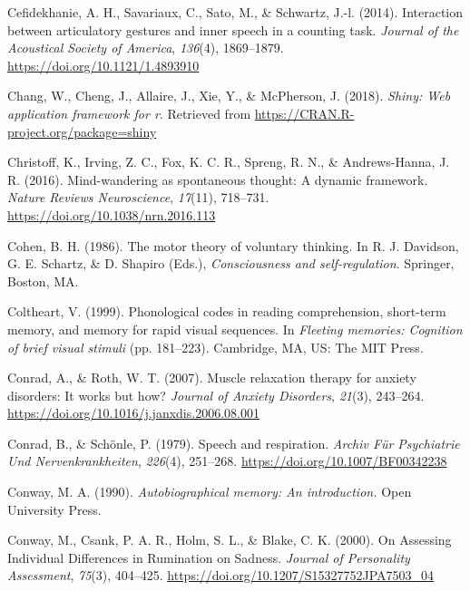 \documentclass[a4paper,12pt,twoside,openright,oldfontcommands]{memoir}
\begin{document}
\leavevmode\hypertarget{ref-cefidekhanie_interaction_2014}{}%
Cefidekhanie, A. H., Savariaux, C., Sato, M., \& Schwartz, J.-l. (2014). Interaction between articulatory gestures and inner speech in a counting task. \emph{Journal of the Acoustical Society of America}, \emph{136}(4), 1869--1879. \url{https://doi.org/10.1121/1.4893910}

\leavevmode\hypertarget{ref-R-shiny}{}%
Chang, W., Cheng, J., Allaire, J., Xie, Y., \& McPherson, J. (2018). \emph{Shiny: Web application framework for r}. Retrieved from \url{https://CRAN.R-project.org/package=shiny}

\leavevmode\hypertarget{ref-christoff_mind-wandering_2016}{}%
Christoff, K., Irving, Z. C., Fox, K. C. R., Spreng, R. N., \& Andrews-Hanna, J. R. (2016). Mind-wandering as spontaneous thought: A dynamic framework. \emph{Nature Reviews Neuroscience}, \emph{17}(11), 718--731. \url{https://doi.org/10.1038/nrn.2016.113}

\leavevmode\hypertarget{ref-cohen_motor_1986}{}%
Cohen, B. H. (1986). The motor theory of voluntary thinking. In R. J. Davidson, G. E. Schartz, \& D. Shapiro (Eds.), \emph{Consciousness and self-regulation}. Springer, Boston, MA.

\leavevmode\hypertarget{ref-coltheart_phonological_1999}{}%
Coltheart, V. (1999). Phonological codes in reading comprehension, short-term memory, and memory for rapid visual sequences. In \emph{Fleeting memories: Cognition of brief visual stimuli} (pp. 181--223). Cambridge, MA, US: The MIT Press.

\leavevmode\hypertarget{ref-conrad_muscle_2007}{}%
Conrad, A., \& Roth, W. T. (2007). Muscle relaxation therapy for anxiety disorders: It works but how? \emph{Journal of Anxiety Disorders}, \emph{21}(3), 243--264. \url{https://doi.org/10.1016/j.janxdis.2006.08.001}

\leavevmode\hypertarget{ref-conrad_speech_1979}{}%
Conrad, B., \& Schönle, P. (1979). Speech and respiration. \emph{Archiv Für Psychiatrie Und Nervenkrankheiten}, \emph{226}(4), 251--268. \url{https://doi.org/10.1007/BF00342238}

\leavevmode\hypertarget{ref-conway_autobiographical_1990}{}%
Conway, M. A. (1990). \emph{Autobiographical memory: An introduction.} Open University Press.

\leavevmode\hypertarget{ref-conway_assessing_2000}{}%
Conway, M., Csank, P. A. R., Holm, S. L., \& Blake, C. K. (2000). On Assessing Individual Differences in Rumination on Sadness. \emph{Journal of Personality Assessment}, \emph{75}(3), 404--425. \url{https://doi.org/10.1207/S15327752JPA7503_04}
\end{document}
